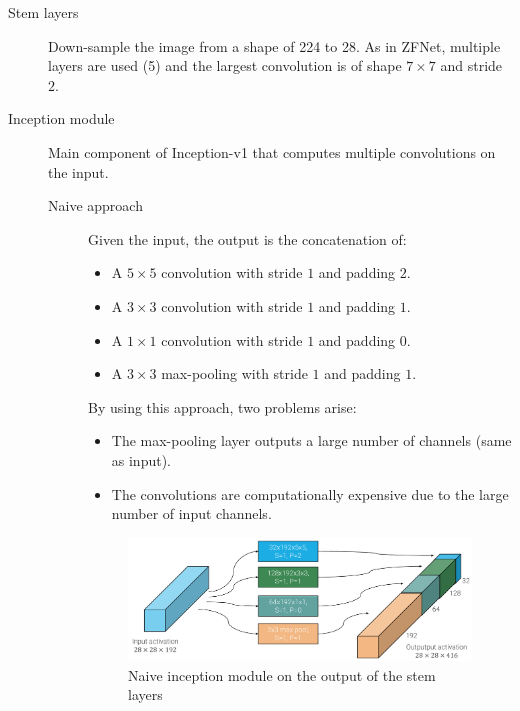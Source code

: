 \begin{description}
    \item[Stem layers]
        Down-sample the image from a shape of 224 to 28.
        As in ZFNet, multiple layers are used (5) and the largest convolution is of shape $7 \times 7$ and stride $2$.

    \item[Inception module] 
        Main component of Inception-v1 that computes multiple convolutions on the input.

        \begin{description}
            \item[Naive approach] 
                Given the input, the output is the concatenation of:
                \begin{itemize}
                    \item A $5 \times 5$ convolution with stride $1$ and padding $2$.
                    \item A $3 \times 3$ convolution with stride $1$ and padding $1$.
                    \item A $1 \times 1$ convolution with stride $1$ and padding $0$.
                    \item A $3 \times 3$ max-pooling with stride $1$ and padding $1$.
                \end{itemize} 

                By using this approach, two problems arise:
                \begin{itemize}
                    \item The max-pooling layer outputs a large number of channels (same as input).
                    \item The convolutions are computationally expensive due to the large number of input channels.
                \end{itemize}

                \begin{figure}[H]
                    \centering
                    \includegraphics[width=0.7\linewidth]{./img/_naive_inception.pdf}
                    \caption{Naive inception module on the output of the stem layers}
                \end{figure}
                

\end{description}
\end{description}
